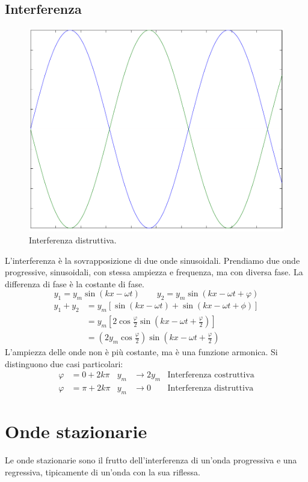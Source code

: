 \subsection{Interferenza}
\begin{figure}[htbp]
   \centering
   \includegraphics[scale=0.5]{immagini/fisica1/interferenza_distruttiva}
   \caption{Interferenza distruttiva.}
\end{figure}
L'interferenza è la sovrapposizione di due onde sinusoidali. Prendiamo due onde progressive, sinusoidali, con stessa ampiezza e frequenza, ma con diversa fase. La differenza di fase è la costante di fase.
\[y_1=y_m\sin(kx-\omega t)\qquad y_2=y_m\sin(kx-\omega t+\varphi)\]
\begin{align*}
y_1+y_2&=y_m\left[\sin\left(kx-\omega t\right)+\sin\left(kx-\omega t+\phi\right)\right]\\
&=y_m\left[2\cos\frac{\varphi}{2}\sin\left(kx-\omega t+\frac{\varphi}{2}\right)\right]\\
&=\left(2y_m\cos\frac{\varphi}{2}\right)\sin\left(kx-\omega t+\frac{\varphi}{2}\right)
\end{align*}
L'ampiezza delle onde non è più costante, ma è una funzione armonica. Si distinguono due casi particolari:
\begin{align*}
\varphi&=0+2k\pi&y_m&\rightarrow 2y_m&\text{Interferenza costruttiva}\\
\varphi&=\pi+2k\pi&y_m&\rightarrow 0&\text{Interferenza distruttiva}
\end{align*}
\section{Onde stazionarie}
Le onde stazionarie sono il frutto dell'interferenza di un'onda progressiva e una regressiva, tipicamente di un'onda con la sua riflessa.


